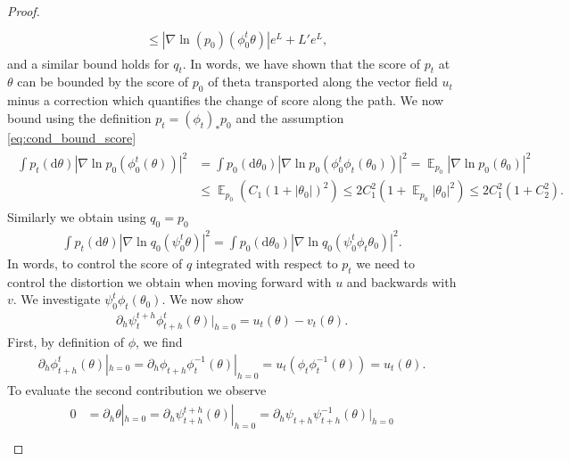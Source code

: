 \documentclass{article}
\theoremstyle{remark}
\DeclareMathOperator{\Ex}{\ensuremath{\mathbb{E}}}
\renewcommand{\d}{\mathrm{d}}
\begin{document}
\begin{proof}
\begin{align}
\begin{split}
     \\
     &\leq 
     |\nabla \ln(p_0)(\phi^t_0\theta) | e^L
     +L'e^L,
     \end{split}
\end{align}
and a similar bound holds for $q_t$.
In words, we have shown that the score of $p_t$ at $\theta$ can be bounded by the score of $p_0$ of theta transported along the vector field $u_t$ minus a correction which quantifies the change of score along the path.
We now bound using the definition $p_t=(\phi_t)_\ast p_0$
and the assumption \eqref{eq:cond_bound_score}
\begin{align}
\begin{split}\label{eq:bound_dq0_final}
    \int p_t(\d \theta) |\nabla\ln p_0(\phi^t_0(\theta))|^2
    &= 
    \int p_0(\d \theta_0) |\nabla\ln p_0(\phi^t_0\phi_t(\theta_0))|^2
    =
    \Ex_{p_0} |\nabla\ln p_0(\theta_0)|^2
    \\
    &\leq \Ex_{p_0} (C_1 (1 + |\theta_0|)^2)
    \leq 2C_1^2 (1 + \Ex_{p_0} |\theta_0|^2)\leq 2C_1^2(1+C_2^2).
    \end{split}
\end{align}
Similarly we obtain using $q_0=p_0$
\begin{align}\label{eq:bound_qt_score_p_t}
   \int p_t(\d \theta) |\nabla\ln q_0(\psi^t_0\theta)|^2
    = 
    \int p_0(\d \theta_0) |
\nabla\ln q_0(\psi^t_0\phi_t\theta_0)|^2 . 
\end{align}
In words, to control the score of $q$ integrated with respect to $p_t$ we need to control the distortion we obtain when moving forward with $u$ and backwards with $v$.
We investigate 
$\psi^t_0\phi_t(\theta_0)$. 
We now show
\begin{align}\label{eq:forward_backward}
    \partial_h \psi^{t+h}_t \phi_{t+h}^t(\theta)|_{h=0}
    = u_t(\theta) - v_t(\theta).
\end{align}
First, by definition of $\phi$, we find
\begin{align}\label{eq:forward}
     \partial_h  \phi_{t+h}^t(\theta)|_{h=0}
     =  \partial_h \phi_{t+h} \phi_t^{-1}(\theta)|_{h=0}
     = u_t(\phi_t \phi_t^{-1}(\theta))=u_t(\theta).
\end{align}
To evaluate the second contribution we observe
\begin{align}\label{eq:backward}
\begin{split}
   0&= \partial_h \theta|_{h=0}=\partial_h \psi^{t+h}_{t+h} (\theta)|_{h=0}
   =\partial_h \psi_{t+h} \psi_{t+h}^{-1} (\theta) |_{h=0}
   \\

\end{split}
\end{align}
\end{proof}
\end{document}
